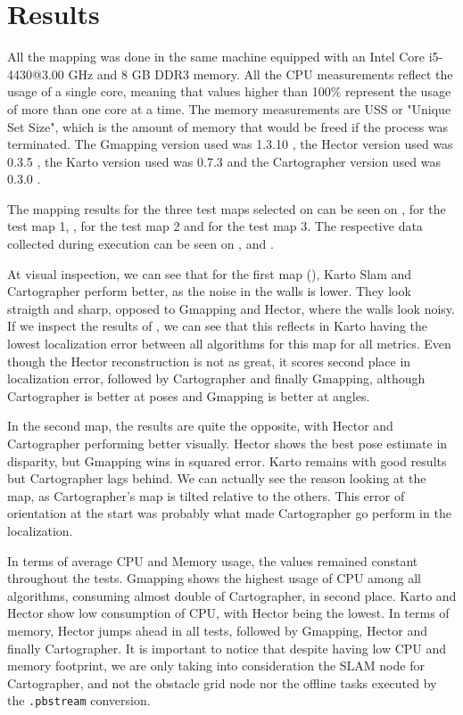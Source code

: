 \chapter{Results}\label{chp:results}

All the mapping was done in the same machine equipped with an Intel Core i5-4430@3.00 GHz and 8 GB DDR3 memory. All the CPU measurements reflect the usage of a single core, meaning that values higher than 100\% represent the usage of more than one core at a time. The memory measurements are USS or "Unique Set Size", which is the amount of memory that would be freed if the process was terminated. The Gmapping version used was 1.3.10 \cite{gmappinggit}, the Hector version used was 0.3.5 \cite{hectorgit}, the Karto version used was 0.7.3 \cite{kartogit} and the Cartographer version used was 0.3.0 \cite{cartographergit}.

The mapping results for the three test maps selected on  can be seen on , for the test map 1, , for the test map 2 and  for the test map 3. The respective data collected during execution can be seen on ,  and .

At visual inspection, we can see that for the first map (), Karto Slam and Cartographer perform better, as the noise in the walls is lower. They look straigth and sharp, opposed to Gmapping and Hector, where the walls look noisy. If we inspect the results of , we can see that this reflects in Karto having the lowest localization error between all algorithms for this map for all metrics. Even though the Hector reconstruction is not as great, it scores second place in localization error, followed by Cartographer and finally Gmapping, although Cartographer is better at poses and Gmapping is better at angles.

In the second map, the results are quite the opposite, with Hector and Cartographer performing better visually. Hector shows the best pose estimate in disparity, but Gmapping wins in squared error. Karto remains with good results but Cartographer lags behind. We can actually see the reason looking at the map, as Cartographer's map is tilted relative to the others. This error of orientation at the start was probably what made Cartographer go perform in the localization.

In terms of average CPU and Memory usage, the values remained constant throughout the tests. Gmapping shows the highest usage of CPU among all algorithms, consuming almost double of Cartographer, in second place. Karto and Hector show low consumption of CPU, with Hector being the lowest. In terms of memory, Hector jumps ahead in all tests, followed by Gmapping, Hector and finally Cartographer. It is important to notice that despite having low CPU and memory footprint, we are only taking into consideration the SLAM node for Cartographer, and not the obstacle grid node nor the offline tasks executed by the \texttt{.pbstream} conversion.

